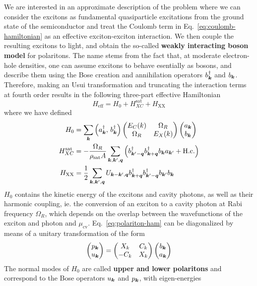 We are interested in an approximate description of the problem where
we can consider the excitons as fundamental quasiparticle excitations
from the ground state of the semiconductor and treat the Coulomb term
in Eq.~\eqref{eq:coulomb-hamiltonian} as an effective exciton-exciton
interaction. We then couple the resulting excitons to light, and
obtain the so-called \textbf{weakly interacting boson model} for
polaritons. The name stems from the fact that, at moderate
electron-hole densities, one can assume excitons to behave esentially
as bosons, and describe them using the Bose creation and annihilation
operators $b_{\bm{k}}^{\dagger}$ and $b_{\bm{k}}$. Therefore, making an Usui
transformation and truncating the interaction terms at fourth order
results in the following three-part effective Hamiltonian
%
\begin{equation}\label{eq:total-ham}
  H_{\text{eff}} = H_0 + H_{XC}^{\text{sat}} + H_{\text{XX}}
\end{equation}
% 
where we have defined
\begin{align}
  H_0 & =\sum_{\bm{k}}\left(a_{\bm{k}}^{\dagger},\, b_{\bm{k}}^{\dagger}\right)\begin{pmatrix} E_C(k) & \Omega_R\\ \Omega_R & E_X(k) \end{pmatrix}\begin{pmatrix} a_{\bm{k}}\\ b_{\bm{k}} \end{pmatrix}\label{eq:polariton-ham}\\
  H_{XC}^{\text{sat}} & =-\frac{\Omega_R}{\rho_{\text{sat}}A}\sum_{\bm{k},\bm{k}^{\prime},\bm{q}}\left(b_{\bm{k}^{\prime}-\bm{q}}^{\dagger}b_{\bm{k} + \bm{q}}^{\dagger}b_{\bm{k}}a_{\bm{k}^{\prime}} + \text{H.c.}\right)\label{eq:saturation-ham}\\
  H_{\text{XX}} & =\frac{1}{2}\sum_{\bm{k},\bm{k}^{\prime},\bm{q}}U_{\bm{k} - \bm{k}^{\prime},\bm{q}}b_{\bm{k} + \bm{q}}^{\dagger}b_{\bm{k}^{\prime} - \bm{q}}^{\dagger}b_{\bm{k}^{\prime}}b_{\bm{k}}\label{eq:interaction-ham}\\
\end{align}
$H_0$ contains the kinetic energy of the excitons and cavity photons,
as well as their harmonic coupling, ie. the conversion of an exciton
to a cavity photon at Rabi frequency $\Omega_R$, which depends on the
overlap between the wavefunctions of the exciton and photon and
$\mu_{\text{cv}}$. Eq.~\eqref{eq:polariton-ham} can be diagonalized by
means of a unitary transformation of the form
%
\begin{equation}\label{eq:hopfield-trans}
  \begin{pmatrix} p_{\bm{k}}\\ u_{\bm{k}} \end{pmatrix} = \begin{pmatrix} X_k & C_k\\ -C_k & X_k \end{pmatrix} \begin{pmatrix} b_{\bm{k}}\\ a_{\bm{k}} \end{pmatrix}
\end{equation}
% 
The normal modes of $H_0$ are called \textbf{upper and lower polaritons} and
correspond to the Bose operators $u_{\bm{k}}$ and $p_{\bm{k}}$, with
eigen-energies
